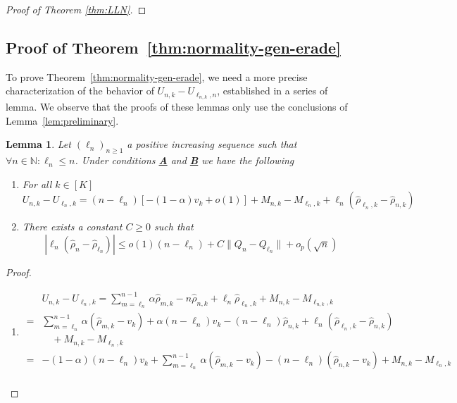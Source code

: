 \documentclass[11pt]{article}
\theoremstyle{plain}
\newtheorem{lemma}[theorem]{Lemma}
\theoremstyle{definition}
\begin{document}
\begin{appendix}
\begin{proof}[Proof of Theorem \ref{thm:LLN}]
\end{proof}

\subsection{Proof of Theorem~\ref{thm:normality-gen-erade}}\label{proof:thm2}To prove Theorem~\ref{thm:normality-gen-erade}, we need a more precise characterization of the behavior of $U_{n,k} - U_{\ell_{n,k},n}$, established in a series of lemma. We observe that the proofs of these lemmas only use the conclusions of Lemma~\ref{lem:preliminary}.

\begin{lemma}\label{lem:diff-U-approx}
	Let $(\ell_n)_{n \geq 1}$ a positive increasing sequence such that $\forall n \in \mathbb{N}: \ell_n \leq n$. Under conditions \hyperlink{CA}{\textbf{A}} and \hyperlink{CB}{\textbf{B}} we have the following
	\begin{enumerate}[label=(\roman*)]
		\item For all \(k \in [K]\) 
		\begin{equation}\label{eq:prelim-2}
			U_{n,k} - U_{\ell_{n},k} = (n - \ell_{n})[-(1 - \alpha)v_k + o(1)] + M_{n,k} - M_{\ell_{n},k} + \ell_{n} (\hat{\rho}_{\ell_{n},k} - \hat{\rho}_{n,k})
		\end{equation}
		\item There exists a constant \(C \geq 0\) such that
		\begin{equation}\label{eq:prelim-22}
			|\ell_n(\hat{\rho}_n - \hat{\rho}_{\ell_n})| \le o(1)(n-\ell_n) + C\|Q_n - Q_{\ell_n}\|  + o_p(\sqrt{n})
		\end{equation}		
	\end{enumerate}
\end{lemma}
\begin{proof}
	\begin{enumerate}[label=(\roman*)]
		\item \begin{align*}
			&U_{n,k} - U_{\ell_{n},k} = \sum_{m=\ell_{n}}^{n-1} \alpha \hat{\rho}_{m,k} - n \hat{\rho}_{n,k} + \ell_{n} \hat{\rho}_{\ell_{n},k} + M_{n,k} - M_{\ell_{n,k},k} \\
			=& \sum_{m=\ell_{n}}^{n-1} \alpha (\hat{\rho}_{m,k} - v_k) + \alpha(n - \ell_{n}) v_k - (n - \ell_{n}) \hat{\rho}_{n,k} + \ell_{n} (\hat{\rho}_{\ell_{n},k} - \hat{\rho}_{n,k}) \\ 
			&\quad + M_{n,k} - M_{\ell_{n},k} \\
			=& -(1 - \alpha)(n - \ell_{n}) v_k + \sum_{m=\ell_{n}}^{n-1} \alpha (\hat{\rho}_{m,k} - v_k) - (n - \ell_{n})(\hat{\rho}_{n,k} - v_k) + M_{n,k} - M_{\ell_{n},k} \\

\end{align*}
\end{enumerate}
\end{proof}
\end{appendix}
\end{document}
